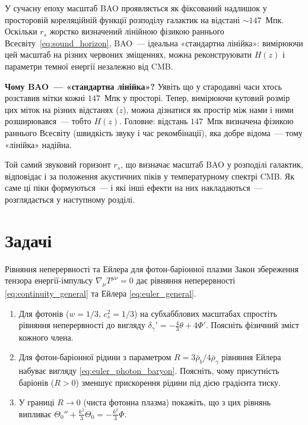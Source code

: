 У сучасну епоху масштаб BAO проявляється як фіксований
надлишок у просторовій кореляційній функції розподілу
галактик на відстані $\sim 147$~Мпк. Оскільки $r_s$
жорстко визначений лінійною фізикою раннього
Всесвіту~\eqref{eq:sound_horizon}, BAO~--- ідеальна
«стандартна лінійка»: вимірюючи цей масштаб на різних
червоних зміщеннях, можна реконструювати $H(z)$ і
параметри темної енергії незалежно від CMB.

\begin{keybox}
\textbf{Чому BAO~--- «стандартна лінійка»?}
Уявіть що у стародавні часи хтось розставив мітки
кожні $147$~Мпк у просторі. Тепер, вимірюючи кутовий
розмір цих міток на різних відстанях ($z$), можна
дізнатися як простір між нами і ними розширювався~---
тобто $H(z)$. Головне: відстань $147$~Мпк визначена
фізикою раннього Всесвіту (швидкість звуку і час
рекомбінації), яка добре відома~--- тому «лінійка» надійна.
\end{keybox}

Той самий звуковий горизонт $r_s$, що визначає масштаб
BAO у розподілі галактик, відповідає і за положення
акустичних піків у температурному спектрі CMB. Як саме
ці піки формуються~--- і які інші ефекти на них
накладаються~--- розглядається у наступному розділі.

\section*{Задачі}

\begin{problem}{Рівняння неперервності та Ейлера для фотон-баріонної плазми}
Закон збереження тензора енергії-імпульсу $\nabla_\mu T^{\mu\nu}=0$ дає
рівняння неперервності \eqref{eq:continuity_general} та Ейлера \eqref{eq:euler_general}.

\begin{enumerate}
    \item Для фотонів ($w=1/3$, $c_s^2=1/3$) на субхабблових масштабах
          спростіть рівняння неперервності до вигляду $\delta_\gamma' = -\frac{4}{3}\theta + 4\Phi'$.
          Поясніть фізичний зміст кожного члена.
    \item Для фотон-баріонної рідини з параметром $R = 3\bar\rho_b/4\bar\rho_\gamma$
          рівняння Ейлера набуває вигляду \eqref{eq:euler_photon_baryon}.
          Поясніть, чому присутність баріонів ($R>0$) зменшує прискорення
          рідини під дією градієнта тиску.
    \item У границі $R \to 0$ (чиста фотонна плазма) покажіть, що з цих рівнянь
          випливає $\Theta_0'' + \frac{k^2}{3}\Theta_0 = -\frac{k^2}{3}\Phi$.
\end{enumerate}
\end{problem}

